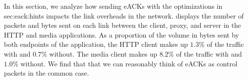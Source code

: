 



In this section, we analyze how sending eACKs with the optimizations in \Cref
{sec:eack:hints} impacts the link overheads in the network.
 displays the number of packets and bytes sent on each
link between the client, proxy, and server in the HTTP and media applications.
As a proportion of the volume in bytes sent by both endpoints of the
application, the HTTP client makes up $1.3\%$ of the traffic with \Sys and
$0.7\%$ without. The media client makes up $8.2\%$ of the traffic with \Sys
and $1.0\%$ without. We find that that we can reasonably think of eACKs as
control packets in the common case.


